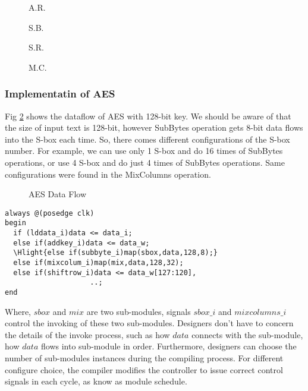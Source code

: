 %
%
%
\begin{figure}
  \centering
  \begin{minipage}[t]{0.4\linewidth}
     \centering
     \caption{A.R.}
     \label{fig-addroundkey}
  \end{minipage}
  \begin{minipage}[t]{0.4\linewidth}
     \centering
     \caption{S.B.}
     \label{fig-subbytes}
  \end{minipage}
  \begin{minipage}[t]{0.4\linewidth}
     \centering
     \caption{S.R.}
     \label{fig-shiftrows}
  \end{minipage}
  \begin{minipage}[t]{0.4\linewidth}
     \centering
     \caption{M.C.}
     \label{fig-mixcolumns}
  \end{minipage}
\end{figure}
\subsubsection{Implementatin of AES}
Fig \ref{fig-aesdatapath} shows the dataflow of AES with 128-bit key. We should be aware of that the size of input text is 128-bit, however SubBytes operation gets 8-bit data flows into the S-box each time. So, there comes different configurations of the S-box number. For example, we can use only 1 S-box and do 16 times of SubBytes operations, or use 4 S-box and do just 4 times of SubBytes operations. Same configurations were found in the MixColumns operation.
\begin{figure}[hbpt]
  \centering
  \caption{AES Data Flow}
  \label{fig-aesdatapath}
\end{figure}
\begin{Verbatim}[commandchars=\\\{\}]
always @(posedge clk)
begin   
  if (lddata_i)data <= data_i;
  else if(addkey_i)data <= data_w;
  \Hlight{else if(subbyte_i)map(sbox,data,128,8);}
  else if(mixcolum_i)map(mix,data,128,32);
  else if(shiftrow_i)data <= data_w[127:120], 
                    ..;
end
\end{Verbatim}
%
Where, $sbox$ and $mix$ are two sub-modules, signals $sbox\_i$ and $mixcolumns\_i$ control the invoking of these two sub-modules. Designers don't have to concern the details of the invoke process, such as how $data$ connects with the sub-module, how $data$ flows into sub-module in order. Furthermore, designers can choose the number of sub-modules instances during the compiling process. For different configure choice, the compiler modifies the controller to issue correct control signals in each cycle, as know as  module schedule.

